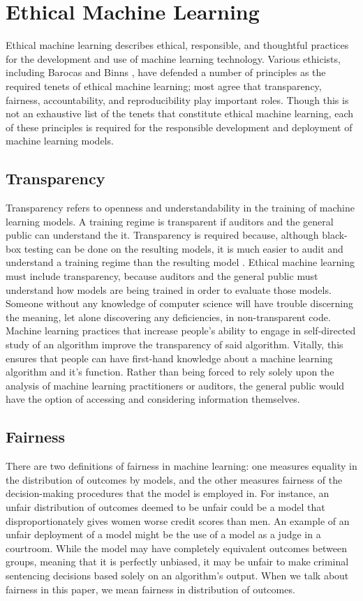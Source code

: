 \documentclass[sigconf]{acmart}
\begin{document}
\section{Ethical Machine Learning}
Ethical machine learning describes ethical, responsible, and thoughtful practices for the development and use of machine learning technology. Various ethicists, including Barocas  and Binns , have defended a number of principles as the required tenets of ethical machine learning; most agree that transparency, fairness, accountability, and reproducibility play important roles. Though this is not an exhaustive list of the tenets that constitute ethical machine learning, each of these principles is required for the responsible development and deployment of machine learning models.

\subsection{Transparency}
Transparency refers to openness and understandability in the training of machine learning models. A training regime is transparent if auditors and the general public can understand the it. Transparency is required because, although black-box testing can be done on the resulting models, it is much easier to audit and understand a training regime than the resulting model \citep{DeLaat2018}. Ethical machine learning must include transparency, because auditors and the general public must understand how models are being trained in order to evaluate those models. Someone without any knowledge of computer science will have trouble discerning the meaning, let alone discovering any deficiencies, in non-transparent code. Machine learning practices that increase people's ability to engage in self-directed study of an algorithm improve the transparency of said algorithm. Vitally, this ensures that people can have first-hand knowledge about a machine learning algorithm and it's function. Rather than being forced to rely solely upon the analysis of machine learning practitioners or auditors, the general public would have the option of accessing and considering information themselves.

\subsection{Fairness}
There are two definitions of fairness in machine learning: one measures equality in the distribution of outcomes by models, and the other measures fairness of the decision-making procedures that the model is employed in. For instance, an unfair distribution of outcomes deemed to be unfair could be a model that disproportionately gives women worse credit scores than men. An example of an unfair deployment of a model might be the use of a model as a judge in a courtroom. While the model may have completely equivalent outcomes between groups, meaning that it is perfectly unbiased, it may be unfair to make criminal sentencing decisions based solely on an algorithm's output. When we talk about fairness in this paper, we mean fairness in distribution of outcomes.
\end{document}
